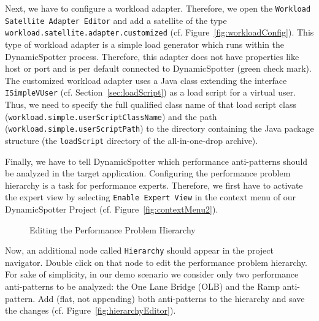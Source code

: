 \documentclass{report}
\newcommand{\DS}{DynamicSpotter }
\begin{document}
Next, we have to configure a workload adapter. Therefore, we open the \texttt{Workload Satellite Adapter Editor} and
add a satellite of the type \texttt{workload.satellite.adapter.customized} (cf. Figure~\ref{fig:workloadConfig}). This
type of workload adapter is a simple load generator which runs within the \DS process. Therefore, this adapter does not have properties like host or port and
is per default connected to \DS (green check mark). The customized workload adapter uses a Java class extending the
interface \texttt{ISimpleVUser} (cf. Section~\ref{sec:loadScript}) as a load script for a virtual user. Thus, we need to
specify the full qualified class name of that load script class (\texttt{workload.simple.userScriptClassName}) and the
path (\texttt{workload.simple.userScriptPath}) to the directory containing the Java package structure (the
\texttt{loadScript} directory of the all-in-one-drop archive).

Finally, we have to tell \DS which performance anti-patterns should be analyzed in the target application. Configuring
the performance problem hierarchy is a task for performance experts. Therefore, we first have to activate the expert
view by selecting \texttt{Enable Expert View} in the context menu of our \DS Project (cf.
Figure~\ref{fig:contextMenu2}). 
\begin{figure}[h!]
\centering
{}
\caption{Editing the Performance Problem Hierarchy}
\label{fig:editingHierarchy}
\end{figure}
Now, an additional node called \texttt{Hierarchy} should appear in the project navigator. 
Double click on that node to edit the performance
problem hierarchy. For sake of simplicity, in our demo scenario we consider only two performance anti-patterns to be
analyzed: the One Lane Bridge (OLB) and the Ramp anti-pattern. Add (flat, not appending) both anti-patterns to the
hierarchy and save the changes (cf. Figure~\ref{fig:hierarchyEditor}).
\end{document}
